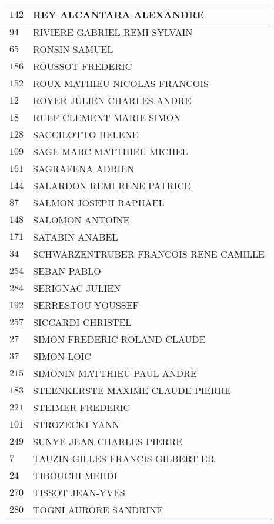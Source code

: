 \begin{xltabular}{\linewidth}{|l|X|}
    \hline
    $142$ & REY ALCANTARA ALEXANDRE \\
    \hline
    $94$ & RIVIERE GABRIEL REMI SYLVAIN \\
    \hline
    $65$ & RONSIN SAMUEL \\
    \hline
    $186$ & ROUSSOT FREDERIC \\
    \hline
    $152$ & ROUX MATHIEU NICOLAS FRANCOIS \\
    \hline
    $12$ & ROYER JULIEN CHARLES ANDRE \\
    \hline
    $18$ & RUEF CLEMENT MARIE SIMON \\
    \hline
    $128$ & SACCILOTTO HELENE \\
    \hline
    $109$ & SAGE MARC MATTHIEU MICHEL \\
    \hline
    $161$ & SAGRAFENA ADRIEN \\
    \hline
    $144$ & SALARDON REMI RENE PATRICE \\
    \hline
    $87$ & SALMON JOSEPH RAPHAEL \\
    \hline
    $148$ & SALOMON ANTOINE \\
    \hline
    $171$ & SATABIN ANABEL \\
    \hline
    $34$ & SCHWARZENTRUBER FRANCOIS RENE CAMILLE \\
    \hline
    $254$ & SEBAN PABLO \\
    \hline
    $284$ & SERIGNAC JULIEN \\
    \hline
    $192$ & SERRESTOU YOUSSEF \\
    \hline
    $257$ & SICCARDI CHRISTEL \\
    \hline
    $27$ & SIMON FREDERIC ROLAND CLAUDE \\
    \hline
    $37$ & SIMON LOIC \\
    \hline
    $215$ & SIMONIN MATTHIEU PAUL ANDRE \\
    \hline
    $183$ & STEENKERSTE MAXIME CLAUDE PIERRE \\
    \hline
    $221$ & STEIMER FREDERIC \\
    \hline
    $101$ & STROZECKI YANN \\
    \hline
    $249$ & SUNYE JEAN-CHARLES PIERRE \\
    \hline
    $7$ & TAUZIN GILLES FRANCIS GILBERT ER \\
    \hline
    $24$ & TIBOUCHI MEHDI \\
    \hline
    $270$ & TISSOT JEAN-YVES \\
    \hline
    $280$ & TOGNI AURORE SANDRINE \\

\end{xltabular}
